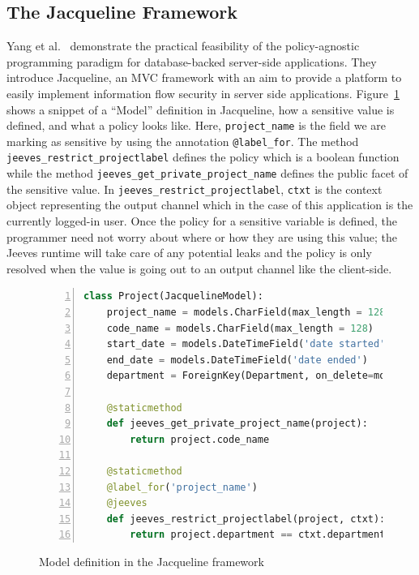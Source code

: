 \subsection{The Jacqueline Framework \label{sec:Jacqueline}}
Yang et al.~\cite{Jacqueline} demonstrate the practical feasibility of the
policy-agnostic programming paradigm for database-backed server-side applications.
They introduce Jacqueline, an MVC framework with an aim to provide a platform to
easily implement information flow security in server side applications. Figure~\ref{fig:DRS}
shows a snippet of a ``Model'' definition in Jacqueline, how a sensitive value is
defined, and what a policy looks like. Here, \texttt{project\_name} is the field
we are marking as sensitive by using the annotation \texttt{@label\_for}. The method
\texttt{jeeves\_restrict\_projectlabel} defines the policy which is a boolean function
while the method \texttt{jeeves\_get\_private\_project\_name} defines the public
facet of the sensitive value. In \texttt{jeeves\_restrict\_projectlabel}, \texttt{ctxt}
is the context object representing the output channel which in the case of this
application is the currently logged-in user. Once the policy for a sensitive variable
is defined, the programmer need not worry about where or how they are using this
value; the Jeeves runtime will take care of any potential leaks and the policy
is only resolved when the value is going out to an output channel like the client-side.

\begin{figure}
\begin{lstlisting}[language=Python, frame=single, breaklines=true, keywordstyle=\color{keywords}, stringstyle=\color{red}, identifierstyle=\color{darkgray}, procnamekeys={def,class}, basicstyle=\footnotesize\ttfamily, numbers=left, extendedchars=true, tabsize=2, showstringspaces=false]
class Project(JacquelineModel):
    project_name = models.CharField(max_length = 128)
    code_name = models.CharField(max_length = 128)
    start_date = models.DateTimeField('date started')
    end_date = models.DateTimeField('date ended')
    department = ForeignKey(Department, on_delete=models.CASCADE)

    @staticmethod
    def jeeves_get_private_project_name(project):
        return project.code_name

    @staticmethod
    @label_for('project_name')
    @jeeves
    def jeeves_restrict_projectlabel(project, ctxt):
        return project.department == ctxt.department
\end{lstlisting}
\caption{Model definition in the Jacqueline framework}
\label{fig:DRS}
\end{figure}

